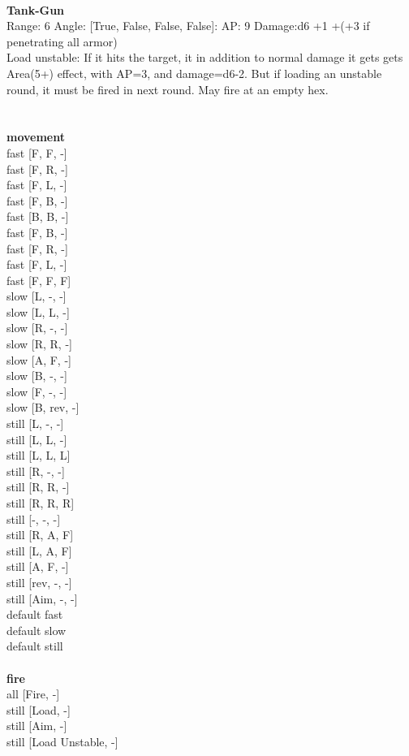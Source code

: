 \ \\
{\bf Tank-Gun } \\



Range: 6  Angle: [True, False, False, False]: AP: 9 Damage:d6 +1 +(+3 if penetrating all armor) \\
Load unstable: If it hits the target, it in addition to normal damage it gets gets Area(5+) effect, with AP=3, and damage=d6-2. But if loading an unstable round, it must be fired in next round. May fire at an empty hex.\\ 




 
\ \\



\ \\ {\bf movement } \\
fast [F, F, -] \\
fast [F, R, -] \\
fast [F, L, -] \\
fast [F, B, -] \\
fast [B, B, -] \\
fast [F, B, -] \\
fast [F, R, -] \\
fast [F, L, -] \\
fast [F, F, F] \\
slow [L, -, -] \\
slow [L, L, -] \\
slow [R, -, -] \\
slow [R, R, -] \\
slow [A, F, -] \\
slow [B, -, -] \\
slow [F, -, -] \\
slow [B, rev, -] \\
still [L, -, -] \\
still [L, L, -] \\
still [L, L, L] \\
still [R, -, -] \\
still [R, R, -] \\
still [R, R, R] \\
still [-, -, -] \\
still [R, A, F] \\
still [L, A, F] \\
still [A, F, -] \\
still [rev, -, -] \\
still [Aim, -, -] \\
default fast \\
default slow \\
default still \\
\ \\ {\bf fire } \\
all [Fire, -] \\
still [Load, -] \\
still [Aim, -] \\
still [Load Unstable, -] \\


